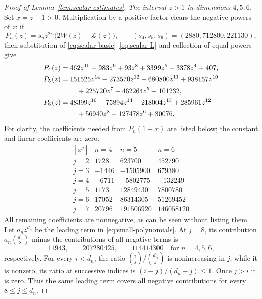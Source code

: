 \begin{proof}[Proof of Lemma~\ref{lem:scalar-estimates}]
\medskip
\noindent\emph{The interval $z>1$ in dimensions $4,5,6$.}
Set $x=z-1>0$.  Multiplication by a positive factor clears the negative
powers of $z$: if
\[
 P_n(z)=s_nz^{2n}\bigl(2W(z)-\mathcal L(z)\bigr),
 \qquad (s_4,s_5,s_6)=(2880,712800,221130),
\]
then substitution of \eqref{eq:scalar-basic}--\eqref{eq:scalar-L}
and collection of equal powers give
\begin{align}
 P_4(z)={}&462z^{10}-983z^9+93z^8
             +3399z^5-3378z^4+407,\notag\\
 P_5(z)={}&151525z^{14}-273570z^{12}-680800z^{11}
             +938157z^{10}\notag\\
         &\quad+225720z^7-462264z^5+101232,\notag\\
 P_6(z)={}&48399z^{16}-75894z^{14}-218004z^{13}
             +285961z^{12}\notag\\
         &\quad+56940z^8-127478z^6+30076.
 \label{eq:small-polynomials}
\end{align}
For clarity, the coefficients needed from $P_n(1+x)$ are listed below;
the constant and linear coefficients are zero.
\[
\begin{array}{c|rrr}
 [x^j]&n=4&n=5&n=6\\ \hline
 j=2&1728&623700&452790\\
 j=3&-1446&-1505900&679380\\
 j=4&-6711&-5802775&-132249\\
 j=5&1173&12849430&7800780\\
 j=6&17052&86314305&51269452\\
 j=7&20796&191506920&146058120
\end{array}
\]
All remaining coefficients are nonnegative, as can be seen without
listing them.  Let $a_nz^{d_n}$ be the leading term in
\eqref{eq:small-polynomials}.  At $j=8$, its contribution
$a_n\binom{d_n}{8}$ minus the contributions of all negative terms is
\[
 11943,\qquad 207280425,\qquad 114414300
 \quad\text{for } n=4,5,6,
\]
respectively.  For every $i<d_n$, the ratio
$\binom{i}{j}/\binom{d_n}{j}$ is nonincreasing in $j$; while it is
nonzero, its ratio at successive indices is $(i-j)/(d_n-j)\le1$.
Once $j>i$ it is zero.  Thus the same leading term covers all negative
contributions for every $8\le j\le d_n$.


\end{proof}
